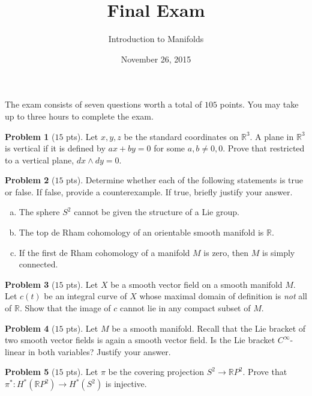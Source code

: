 \documentclass{amsart}
\newcommand{\+}[1]{\ensuremath{\mathbf{#1}}}
\newcommand{\R}{{\mathbb R}}
\theoremstyle{definition}
\newtheorem{prob}{Problem}
\begin{document}
\title{Final Exam}
\date{November 26, 2015}
\author{Introduction to Manifolds}

\maketitle


The exam consists of seven questions  worth a total of $105$ points.
You may take up to three hours to complete the exam.


\begin{prob}[$15$ pts]
 Let $x,y,z$ be the standard coordinates on $\R^3$.  A plane in $\R^3$
 is vertical if it is defined by 
 $ax + by = 0$ for some $a,b \neq 0,0$.
 Prove that restricted to a vertical plane,
 $dx \wedge dy = 0$.
\end{prob}


\begin{prob}[$15$ pts]
Determine whether each of the following statements is true or false.  If false, provide a counterexample.  If true, briefly justify your answer.
\begin{enumerate}[(a)]
 \item The sphere $S^2$ cannot be given the structure of a Lie group.
 \item The top de Rham cohomology of an orientable smooth manifold is $\R$.
 \item If the first de Rham cohomology of a manifold $M$ is zero, then $M$ is simply connected.
\end{enumerate}
\end{prob}



\begin{prob}[$15$ pts]
Let $X$ be a smooth vector field on a smooth manifold $M$.  
Let $c(t)$ be an integral curve of $X$ whose
maximal domain of definition is \emph{not} all of $\R$.
Show that the image
of $c$ cannot lie in any compact subset of $M$.
\end{prob}


\begin{prob}[$15$ pts]
Let $M$ be a smooth manifold.  Recall
that the Lie bracket of two smooth vector fields is
again a smooth vector field.  Is the Lie bracket $C^{\infty}$-linear in both variables?  Justify your answer.
\end{prob}




\begin{prob}[$15$ pts]
 Let $\pi$ be the  covering projection $S^2 \to \R P^2$.
 Prove that $\pi^*: H^*(\R P^2) \to H^*(S^2)$ is injective.
\end{prob}
\end{document}
